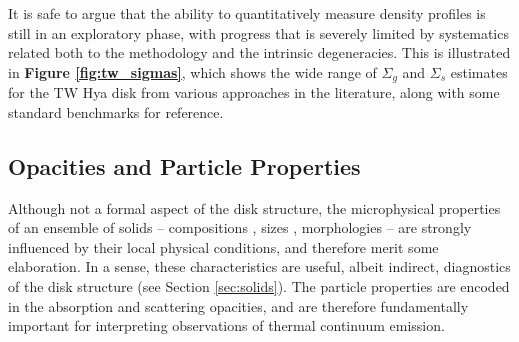 \documentclass[a4paper]{ar-1col}
\begin{document}
It is safe to argue that the ability to quantitatively measure density profiles is still in an exploratory phase, with progress that is severely limited by systematics related both to the methodology and the intrinsic degeneracies.  This is illustrated in {\bf Figure \ref{fig:tw_sigmas}}, which shows the wide range of $\Sigma_g$ and $\Sigma_s$ estimates for the TW Hya disk from various approaches in the literature, along with some standard benchmarks for reference.    

 


\subsection{Opacities and Particle Properties} \label{sec:opacities}

Although not a formal aspect of the disk structure, the microphysical properties of an ensemble of solids -- compositions \citep{pollack94}, sizes \citep{miyake93}, morphologies \citep{henning96} -- are strongly influenced by their local physical conditions, and therefore merit some elaboration.  In a sense, these characteristics are useful, albeit indirect, diagnostics of the disk structure (see Section \ref{sec:solids}).  The particle properties are encoded in the absorption and scattering opacities, and are therefore fundamentally important for interpreting observations of thermal continuum emission.          

\end{document}
